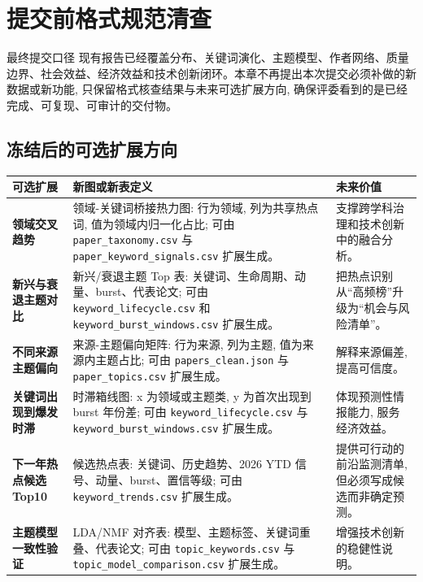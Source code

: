 \section{提交前格式规范清查}

\begin{reportbox}{最终提交口径}
现有报告已经覆盖分布、关键词演化、主题模型、作者网络、质量边界、社会效益、经济效益和技术创新闭环。本章不再提出本次提交必须补做的新数据或新功能, 只保留格式核查结果与未来可选扩展方向, 确保评委看到的是已经完成、可复现、可审计的交付物。
\end{reportbox}

\subsection{冻结后的可选扩展方向}

\begin{center}
\begin{tabularx}{\textwidth}{>{\bfseries}p{34mm}>{\raggedright\arraybackslash}X>{\raggedright\arraybackslash}X}
\toprule
可选扩展 & 新图或新表定义 & 未来价值 \\
\midrule
领域交叉趋势 & 领域-关键词桥接热力图: 行为领域, 列为共享热点词, 值为领域内归一化占比; 可由 \texttt{paper\_taxonomy.csv} 与 \texttt{paper\_keyword\_signals.csv} 扩展生成。 & 支撑跨学科治理和技术创新中的融合分析。 \\
新兴与衰退主题对比 & 新兴/衰退主题 Top 表: 关键词、生命周期、动量、burst、代表论文; 可由 \texttt{keyword\_lifecycle.csv} 和 \texttt{keyword\_burst\_windows.csv} 扩展生成。 & 把热点识别从“高频榜”升级为“机会与风险清单”。 \\
不同来源主题偏向 & 来源-主题偏向矩阵: 行为来源, 列为主题, 值为来源内主题占比; 可由 \texttt{papers\_clean.json} 与 \texttt{paper\_topics.csv} 扩展生成。 & 解释来源偏差, 提高可信度。 \\
关键词出现到爆发时滞 & 时滞箱线图: x 为领域或主题类, y 为首次出现到 burst 年份差; 可由 \texttt{keyword\_lifecycle.csv} 与 \texttt{keyword\_burst\_windows.csv} 扩展生成。 & 体现预测性情报能力, 服务经济效益。 \\
下一年热点候选 Top10 & 候选热点表: 关键词、历史趋势、2026 YTD 信号、动量、burst、置信等级; 可由 \texttt{keyword\_trends.csv} 扩展生成。 & 提供可行动的前沿监测清单, 但必须写成候选而非确定预测。 \\
主题模型一致性验证 & LDA/NMF 对齐表: 模型、主题标签、关键词重叠、代表论文; 可由 \texttt{topic\_keywords.csv} 与 \texttt{topic\_model\_comparison.csv} 扩展生成。 & 增强技术创新的稳健性说明。 \\
\bottomrule
\end{tabularx}
\end{center}


